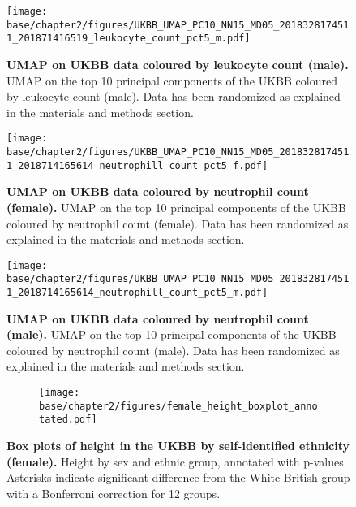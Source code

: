 \newpage

\begin{figure}[ht]
    \centering
    \texttt{[image: base/chapter2/figures/UKBB\_UMAP\_PC10\_NN15\_MD05\_2018328174511\_201871416519\_leukocyte\_count\_pct5\_m.pdf]}
    \caption[UMAP on UKBB data coloured by leukocyte count (male)]{\textbf{UMAP on UKBB data coloured by leukocyte count (male).} UMAP on the top 10 principal components of the UKBB coloured by leukocyte count (male). Data has been randomized as explained in the materials and methods section.}
    \label{fig:supp_ukbb_leukocyte_m}
\end{figure}

\newpage

\begin{figure}[ht]
    \centering
    \texttt{[image: base/chapter2/figures/UKBB\_UMAP\_PC10\_NN15\_MD05\_2018328174511\_2018714165614\_neutrophill\_count\_pct5\_f.pdf]}
    \caption[UMAP on UKBB data coloured by neutrophil count (female)]{\textbf{UMAP on UKBB data coloured by neutrophil count (female).} UMAP on the top 10 principal components of the UKBB coloured by neutrophil count (female). Data has been randomized as explained in the materials and methods section.}
    \label{fig:supp_ukbb_neutrophill_f}
\end{figure}

\newpage

\begin{figure}[ht]
    \centering
    \texttt{[image: base/chapter2/figures/UKBB\_UMAP\_PC10\_NN15\_MD05\_2018328174511\_2018714165614\_neutrophill\_count\_pct5\_m.pdf]}
    \caption[UMAP on UKBB data coloured by neutrophil count (male)]{\textbf{UMAP on UKBB data coloured by neutrophil count (male).} UMAP on the top 10 principal components of the UKBB coloured by neutrophil count (male). Data has been randomized as explained in the materials and methods section.}
    \label{fig:supp_ukbb_neutrophill_m}
\end{figure}

\newpage

\begin{figure}[ht]
    \centering
    \begin{subfigure}{\textwidth}
    \texttt{[image: base/chapter2/figures/female\_height\_boxplot\_annotated.pdf]}
    \end{subfigure}
    \caption[Box plots of height in the UKBB by self-identified ethnicity (female)]{\textbf{Box plots of height in the UKBB by self-identified ethnicity (female).} Height by sex and ethnic group, annotated with p-values. Asterisks indicate significant difference from the White British group with a Bonferroni correction for 12 groups.}
    \label{fig:supp_box_height_f}
\end{figure}

